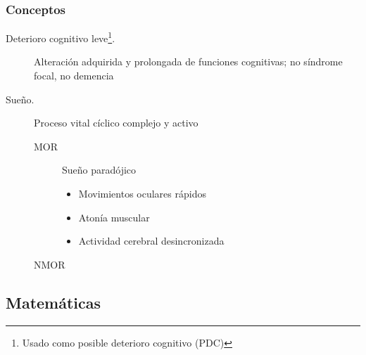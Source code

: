 \documentclass{beamer}
\begin{document}
\begin{frame}

\frametitle{Conceptos}
\begin{description}

\item[Deterioro cognitivo leve\footnote{Usado como posible deterioro cognitivo (PDC)}.] 
Alteraci\'on adquirida y prolongada de funciones cognitivas; no s\'indrome focal, no demencia 
\item[Sue\~no.] Proceso vital c\'iclico complejo y activo%
\begin{description}
\item[MOR ] Sue\~no parad\'ojico
\begin{itemize}
\item Movimientos oculares r\'apidos
\item Aton\'ia muscular
\item Actividad cerebral desincronizada

\end{itemize}
\item[NMOR] 
\end{description}
\end{description}
\end{frame}


\subsection{Matem\'aticas}
\end{document}
